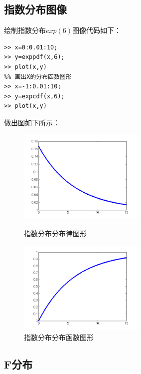 \documentclass[12pt, a4paper]{ctexart}
\begin{document}
\subsection{指数分布图像}

绘制指数分布$ exp(6) $图像代码如下：
\begin{lstlisting}[style=Matlab-editor]
%% 画出X的概率密度图形
>> x=0:0.01:10;
>> y=exppdf(x,6);
>> plot(x,y)
%% 画出X的分布函数图形
>> x=-1:0.01:10;
>> y=expcdf(x,6);
>> plot(x,y)

\end{lstlisting}
做出图如下所示：
\begin{figure}[ht]
	\centering
	\begin{minipage}[t]{0.48\textwidth}
		\centering
		\includegraphics[width=6cm]{p3.png}
		\caption{指数分布分布律图形}
	\end{minipage}
	\begin{minipage}[t]{0.48\textwidth}
		\centering
		\includegraphics[width=6cm]{p4.png}
		\caption{指数分布分布函数图形}
	\end{minipage}
\end{figure}


\subsection{F分布}
\end{document}
